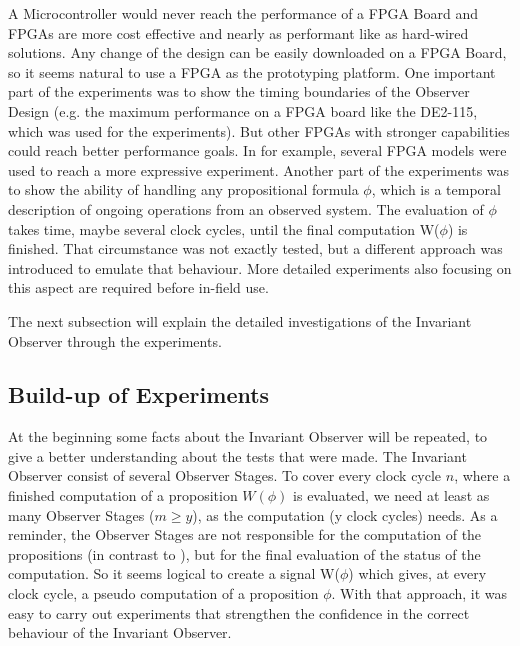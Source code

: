 A Microcontroller would never reach the performance of a FPGA Board and FPGAs are more cost effective and nearly as performant like as hard-wired solutions. 
Any change of the design can be easily downloaded on a FPGA Board, so it seems natural to use a FPGA as the prototyping platform.
One important part of the experiments was to show the timing boundaries of the Observer Design 
(e.g. the maximum performance on a FPGA board like the DE2-115, which was used for the experiments).
But other FPGAs with stronger capabilities could reach better performance goals. 
In \cite{RTFMBJ13} for example, several FPGA models were used to reach a more expressive experiment.    
Another part of the experiments was to show the ability of handling any propositional formula $\phi$, 
which is a temporal description of ongoing operations from an observed system. 
The evaluation of $\phi$ takes time, maybe several clock cycles, until the final computation W($\phi$) is finished. 
That circumstance was not exactly tested, but a different approach was introduced to emulate that behaviour. 
More detailed experiments also focusing on this aspect are required before in-field use.

The next subsection will explain the detailed investigations of the Invariant Observer through the experiments.   

\subsection{Build-up of Experiments}
\label{chapter:4:section:1:subsection:2}
At the beginning some facts about the Invariant Observer will be repeated, to give a better understanding about the tests that were made.
The Invariant Observer consist of several Observer Stages. 
To cover every clock cycle $n$, where a finished computation of a proposition $W(\phi)$ is evaluated, we need at least as many Observer Stages ($m \ge y$), as
the computation (y clock cycles) needs. 
As a reminder, the Observer Stages are not responsible for the computation of the propositions (in contrast to \cite{RTFMBJ13}),
but for the final evaluation of the status of the computation.
So it seems logical to create a signal W($\phi$) which gives, at every clock cycle, a pseudo computation of a proposition $\phi$. 
With that approach, it was easy to carry out experiments that strengthen the confidence in the correct behaviour of the Invariant Observer.
 
